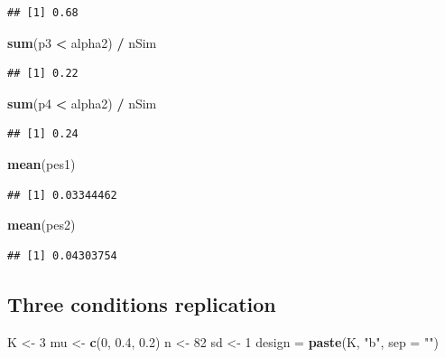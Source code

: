 \documentclass[]{book}
\newenvironment{Shaded}{\begin{snugshade}}{\end{snugshade}}
\newcommand{\DataTypeTok}[1]{\textcolor[rgb]{0.13,0.29,0.53}{#1}}
\newcommand{\DecValTok}[1]{\textcolor[rgb]{0.00,0.00,0.81}{#1}}
\newcommand{\FloatTok}[1]{\textcolor[rgb]{0.00,0.00,0.81}{#1}}
\newcommand{\KeywordTok}[1]{\textcolor[rgb]{0.13,0.29,0.53}{\textbf{#1}}}
\newcommand{\NormalTok}[1]{#1}
\newcommand{\OperatorTok}[1]{\textcolor[rgb]{0.81,0.36,0.00}{\textbf{#1}}}
\newcommand{\StringTok}[1]{\textcolor[rgb]{0.31,0.60,0.02}{#1}}
\begin{document}
\begin{verbatim}
## [1] 0.68
\end{verbatim}

\begin{Shaded}
\begin{Highlighting}[]
\KeywordTok{sum}\NormalTok{(p3 }\OperatorTok{<}\StringTok{ }\NormalTok{alpha2) }\OperatorTok{/}\StringTok{ }\NormalTok{nSim}
\end{Highlighting}
\end{Shaded}

\begin{verbatim}
## [1] 0.22
\end{verbatim}

\begin{Shaded}
\begin{Highlighting}[]
\KeywordTok{sum}\NormalTok{(p4 }\OperatorTok{<}\StringTok{ }\NormalTok{alpha2) }\OperatorTok{/}\StringTok{ }\NormalTok{nSim}
\end{Highlighting}
\end{Shaded}

\begin{verbatim}
## [1] 0.24
\end{verbatim}

\begin{Shaded}
\begin{Highlighting}[]
\KeywordTok{mean}\NormalTok{(pes1)}
\end{Highlighting}
\end{Shaded}

\begin{verbatim}
## [1] 0.03344462
\end{verbatim}

\begin{Shaded}
\begin{Highlighting}[]
\KeywordTok{mean}\NormalTok{(pes2)}
\end{Highlighting}
\end{Shaded}

\begin{verbatim}
## [1] 0.04303754
\end{verbatim}

\hypertarget{three-conditions-replication-2}{%
\subsection{Three conditions replication}\label{three-conditions-replication-2}}

\begin{Shaded}
\begin{Highlighting}[]
\NormalTok{K <-}\StringTok{ }\DecValTok{3}
\NormalTok{mu <-}\StringTok{ }\KeywordTok{c}\NormalTok{(}\DecValTok{0}\NormalTok{, }\FloatTok{0.4}\NormalTok{, }\FloatTok{0.2}\NormalTok{)}
\NormalTok{n <-}\StringTok{ }\DecValTok{82}
\NormalTok{sd <-}\StringTok{ }\DecValTok{1}
\NormalTok{design =}\StringTok{ }\KeywordTok{paste}\NormalTok{(K, }\StringTok{"b"}\NormalTok{, }\DataTypeTok{sep =} \StringTok{""}\NormalTok{)}
\end{Highlighting}
\end{Shaded}
\end{document}
